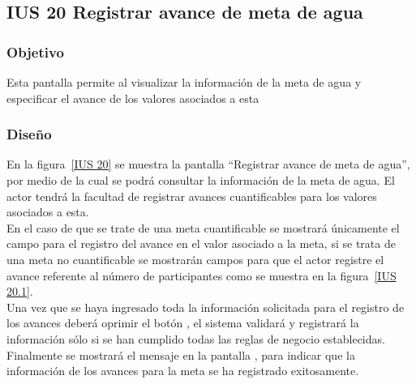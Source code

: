 \subsection{IUS 20 Registrar avance de meta de agua}

\subsubsection{Objetivo}

    Esta pantalla permite al  visualizar la información de la meta de agua y especificar el avance de los valores asociados a esta
    
\subsubsection{Diseño}

        En la figura~\ref{IUS 20} se muestra la pantalla ``Registrar avance de meta de agua'', por medio de la cual se podrá consultar la información de la meta de agua. El actor tendrá la facultad de registrar avances cuantificables para los valores asociados a esta.\\
        
        En el caso de que se trate de una meta cuantificable se mostrará únicamente el campo para el registro del avance en el valor asociado a la meta, si se trata de una meta no cuantificable se mostrarán campos para que el actor registre el avance referente al número de participantes como se muestra en la figura~\ref{IUS 20.1}.\\
        
        Una vez que se haya ingresado toda la información solicitada para el registro de los avances deberá oprimir el botón , el sistema validará y registrará la información sólo si se han cumplido todas las reglas de negocio establecidas.\\
    
      Finalmente se mostrará el mensaje  en la pantalla , para indicar que la información de los avances para la meta se ha registrado exitosamente.
        

